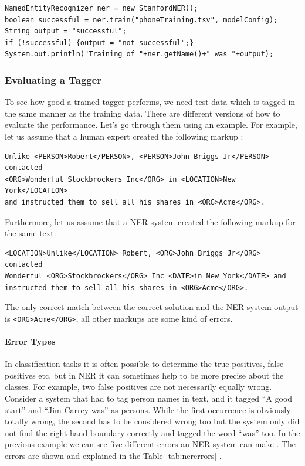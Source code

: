 \begin{codelisting}
\begin{lstlisting}[label=listing:trainNER,caption=Train a named entity recognizer.,frame=tb]
NamedEntityRecognizer ner = new StanfordNER();
boolean successful = ner.train("phoneTraining.tsv", modelConfig);
String output = "successful";
if (!successful) {output = "not successful";}
System.out.println("Training of "+ner.getName()+" was "+output);
\end{lstlisting}
\end{codelisting}

\subsubsection{Evaluating a Tagger}
To see how good a trained tagger performs, we need test data which is tagged in the same manner as the training data. There are different versions of how to evaluate the performance. Let's go through them using an example. For example, let us assume that a human expert created the following markup \cite{nadeau2007yooname}:

\begin{verbatim}
Unlike <PERSON>Robert</PERSON>, <PERSON>John Briggs Jr</PERSON> contacted 
<ORG>Wonderful Stockbrockers Inc</ORG> in <LOCATION>New York</LOCATION> 
and instructed them to sell all his shares in <ORG>Acme</ORG>.
\end{verbatim}

Furthermore, let us assume that a NER system created the following markup \cite{nadeau2007yooname} for the same text:

\begin{verbatim}
<LOCATION>Unlike</LOCATION> Robert, <ORG>John Briggs Jr</ORG> contacted 
Wonderful <ORG>Stockbrockers</ORG> Inc <DATE>in New York</DATE> and 
instructed them to sell all his shares in <ORG>Acme</ORG>.
\end{verbatim}

The only correct match between the correct solution and the NER system output is \verb$<ORG>Acme</ORG>$, all other markups are some kind of errors.

\paragraph{Error Types}
In classification tasks it is often possible to determine the true positives, false positives etc. but in NER it can sometimes help to be more precise about the classes. For example, two false positives are not necessarily equally wrong. Consider a system that had to tag person names in text, and it tagged ``A good start'' and ``Jim Carrey was'' as persons. While the first occurrence is obviously totally wrong, the second has to be considered wrong too but the system only did not find the right hand boundary correctly and tagged the word ``was'' too.
In the previous example we can see five different errors an NER system can make \cite{manning2006nererrors}. The errors are shown and explained in the Table \ref{tab:nererrors} \cite{nadeau2007yooname}.

